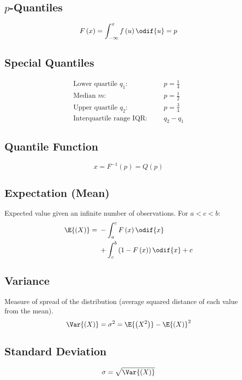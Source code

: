 \documentclass{article}
\begin{document}
\begin{minipage}{126.1962963mm}
\begin{multicols}{2}
        \subsection{\texorpdfstring{\(p\)}{p}-Quantiles}
        \begin{equation*}
            F\left( x \right) = \int_{-\infty}^x f\left( u \right) \odif{u} = p
        \end{equation*}
        \subsection{Special Quantiles}
        \begin{align*}
            \text{Lower quartile \(q_1\):}  &  &  & p = \frac{1}{4} \\
            \text{Median \(m\):}            &  &  & p = \frac{1}{2} \\
            \text{Upper quartile \(q_2\):}  &  &  & p = \frac{3}{4} \\
            \text{Interquartile range IQR:} &  &  & q_2 - q_1
        \end{align*}
        \subsection{Quantile Function}
        \begin{equation*}
            x = F^{-1}\left( p \right) = Q\left( p \right)
        \end{equation*}
        \subsection{Expectation (Mean)}
        Expected value given an infinite number of observations. For \(a < c < b\):
        \begin{equation*}
            \E{\left(X\right)} = \begin{aligned}[t]
                 & -\int_{a}^c F\left( x \right) \odif{x}                     \\
                 & + \int_c^b \left(1 - F\left( x \right)\right) \odif{x} + c
            \end{aligned}
        \end{equation*}
        \subsection{Variance}
        Measure of spread of the distribution (average squared distance of each value from the mean).
        \begin{equation*}
            \Var{\left( X \right)} = \sigma^2 = \E{\left( X^2 \right)} - \E{\left( X \right)}^2
        \end{equation*}
        \subsection{Standard Deviation}
        \begin{equation*}
            \sigma = \sqrt{\Var{\left( X \right)}}
        \end{equation*}
    \end{multicols}
\end{minipage}\hfill%
\end{document}

